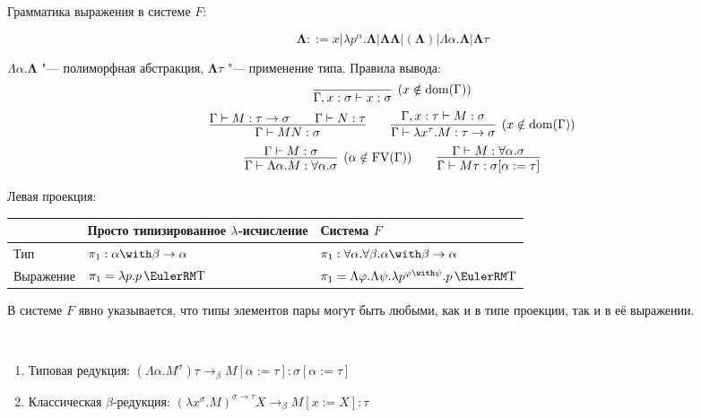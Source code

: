 \begin{definition}[система $F$]
Грамматика выражения в системе $F$:
    \begin{bnf}
    \[
        \mathbf\Lambda ::= x | \lambda p^\alpha . \mathbf\Lambda | \mathbf\Lambda \mathbf\Lambda | (\mathbf\Lambda)
        | \Lambda \alpha . \mathbf\Lambda | \mathbf\Lambda \tau
    \]
    \end{bnf}%
    $\Lambda \alpha . \mathbf\Lambda$ "--- полиморфная абстракция, $\mathbf\Lambda \tau$ "--- применение типа.
    Правила вывода:
    \inferspacing
    \begin{gather*}
        \infer[(x \notin \mathrm{dom}(\Gamma))]{\Gamma, x : \sigma \vdash x : \sigma}{} \\
        \infer{\Gamma \vdash MN : \sigma}{\Gamma \vdash M : \tau \to \sigma && \Gamma \vdash N : \tau} \qquad
        \infer[(x \notin \mathrm{dom}(\Gamma))]
                {\Gamma \vdash \lambda x^\tau . M : \tau \to \sigma}{\Gamma, x : \tau \vdash M : \sigma} \\
        \infer[(\alpha \notin \FV(\Gamma))]{\Gamma \vdash \Lambda \alpha . M : \forall \alpha . \sigma}{\Gamma \vdash M : \sigma} \qquad
        \infer{\Gamma \vdash M \tau : \sigma [\alpha := \tau]}{\Gamma \vdash M : \forall \alpha . \sigma}
    \end{gather*}
\end{definition}

\begin{example} Левая проекция:
    \begin{center}
    \begin{tabular}{l l l} \toprule
        & Просто типизированное $\lambda$-исчисление & Система $F$ \\ \midrule
        Тип & $\pi_1:\alpha\with\beta\to\alpha$ & $\pi_1:\forall \alpha . \forall \beta . \alpha \with \beta \to \alpha$ \\
        Выражение & $\pi_1 = \lambda p . p \comb T$ & $\pi_1 = \Lambda \varphi . \Lambda \psi . \lambda p^{\varphi\with\psi} . p \comb T$
        \\ \bottomrule
    \end{tabular}
    \end{center}
В системе $F$ явно указывается, что типы элементов пары могут быть любыми, как и в типе проекции, так и в её выражении.
\end{example}

\begin{definition} \ 
    \begin{enumerate}
        \item Типовая редукция: $\left(\Lambda \alpha . M^\sigma\right) \tau \to_\beta M[\alpha:=\tau] : \sigma[\alpha := \tau]$
        \item Классическая $\beta$-редукция: $\left(\lambda x^\sigma.M\right)^{\sigma\to\tau} X \to_\beta M [x:=X] : \tau$
    \end{enumerate}
\end{definition}

